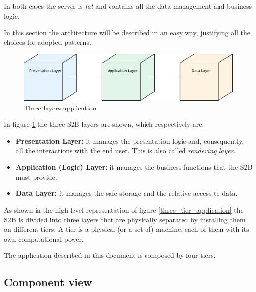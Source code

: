In both cases the server is \textit{fat} and contains all the data management and business logic.

In this section the architecture will be described in an easy way, justifying all the choices for adopted patterns.

\begin{figure}[H]
    \begin{center}
        \includegraphics[width=\textwidth]{img/3-tier.png}
        \caption{Three layers application}\label{three_tier_desc}
    \end{center}
\end{figure}

In figure \ref{three_tier_desc} the three S2B layers are shown, which respectively are:
\begin{itemize}
    \item \textbf{Presentation Layer:} it manages the presentation logic and, consequently, all the interactions with the end user. This is also called \textit{rendering layer}.
    \item \textbf{Application (Logic) Layer:} it manages the business functions that the S2B must provide.
    \item \textbf{Data Layer:} it manages the safe storage and the relative access to data.
\end{itemize}

As shown in the high level representation of figure \ref{three_tier_application} the S2B is divided into three layers that are physically separated by installing them on different tiers. A tier is a physical (or a set of) machine, each of them with its own computational power.

The application described in this document is composed by four tiers.



\subsection{Component view}

